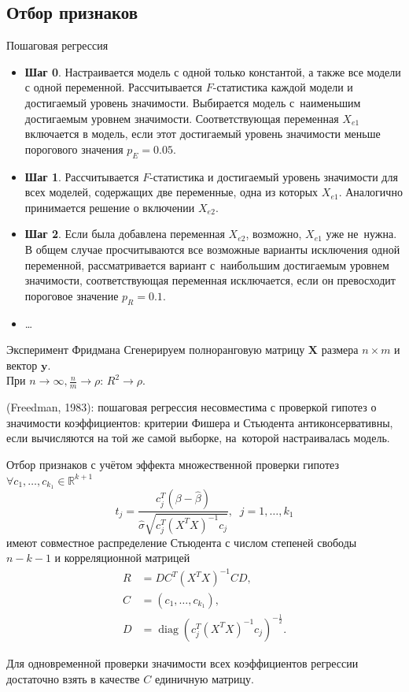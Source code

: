 \documentclass[9pt,pdf,utf8,hyperref={unicode},aspectratio=169]{beamer}
\DeclareMathOperator{\diag}{diag}
\begin{document}
\subsection{Отбор признаков}
\begin{frame}{Пошаговая регрессия}
    \begin{itemize}
    \item \textbf{Шаг 0}. Настраивается модель с одной только константой, а также все модели с одной переменной.
          Рассчитывается $F$-статистика каждой модели и достигаемый уровень значимости.
          Выбирается модель с~наименьшим достигаемым уровнем значимости.
          Соответствующая переменная $X_{e1}$ включается в модель, если этот достигаемый уровень значимости меньше порогового значения $p_E = 0.05$.
    \item \textbf{Шаг 1}. Рассчитывается $F$-статистика и достигаемый уровень значимости для всех моделей, содержащих две переменные, одна из которых $X_{e1}$.
          Аналогично принимается решение о включении $X_{e2}$.
    \item \textbf{Шаг 2}. Если была добавлена переменная $X_{e2}$, возможно, $X_{e1}$ уже не~нужна.
          В общем случае просчитываются все возможные варианты исключения одной переменной, рассматривается вариант с~наибольшим достигаемым уровнем значимости, соответствующая переменная исключается, если он превосходит пороговое значение $p_R = 0.1$.
    \item \dots
    \end{itemize}
\end{frame}

\begin{frame}{Эксперимент Фридмана}
    Сгенерируем полноранговую матрицу $\mathbf{X}$ размера $n\times m$ и вектор $\mathbf{y}$.\\
    При $n \to \infty, \frac{n}{m} \to \rho$: $R^2 \to \rho.$  \bigskip
    
    (Freedman, 1983): пошаговая регрессия несовместима с проверкой гипотез о значимости коэффициентов: критерии Фишера и Стьюдента антиконсервативны, если вычисляются на той же самой выборке, на~которой настраивалась модель.
\end{frame}

\begin{frame}{Отбор признаков с учётом эффекта множественной проверки гипотез}
    $\forall c_1,\dots,c_{k_1} \in \mathbb{R}^{k+1}$
    $$t_j = \frac{c_j^T \left(\beta-\hat{\beta}\right)}{\hat{\sigma} \sqrt{c_j^T \left(X^TX\right)^{-1}c_j}}, \;\; j=1,\dots,k_1$$
    имеют совместное распределение Стьюдента с числом степеней свободы $n-k-1$ и корреляционной матрицей
    \begin{align*}
    R &= DC^T \left(X^TX\right)^{-1} CD,\\
    C &= \left(c_1,\dots,c_{k_1}\right), \\
    D &= \diag\left(c_j^T \left(X^TX\right)^{-1}c_j\right)^{-\frac1{2}}.
    \end{align*}

    \bigskip

    Для одновременной проверки значимости всех коэффициентов регрессии достаточно взять в качестве $C$ единичную матрицу.
\end{frame}
\end{document}
